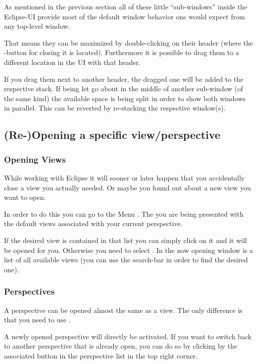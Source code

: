 \documentclass[twoside=false]{scrbook}
\newcommand{\eclipse}{Eclipse\xspace}
\begin{document}
	As mentioned in the previous section all of these little “sub-windows” inside the \eclipse-UI provide most of the default window behavior one would expect from any top-level window.
	
	That means they can be maximized by double-clicking on their header (where the -button for closing it is located). Furthermore it is possible to drag them to a different location in the UI with that header.
	
	If you drag them next to another header, the dragged one will be added to the respective stack. If being let go about in the middle of another sub-window (of the same kind) the available space is being split in order to show both windows in parallel. This can be reverted by re-stacking the respective window(s).
	
	
	\subsection{(Re-)Opening a specific view/perspective}
	\subsubsection{Opening Views}
	While working with \eclipse it will sooner or later happen that you accidentally close a view you actually needed. Or maybe you found out about a new view you want to open.
	
	In order to do this you can go to the Menu . The you are being presented with the default views associated with your current perspective.
	
	If the desired view is contained in that list you can simply click on it and it will be opened for you. Otherwise you need to select . In the now opening window is a list of all available views (you can use the search-bar in order to find the desired one).
	
	
	\subsubsection{Perspectives}
	A perspective can be opened almost the same as a view. The only difference is that you need to use .
	
	A newly opened perspective will directly be activated. If you want to switch back to another perspective that is already open, you can do so by clicking by the associated button in the perspective list in the top right corner.
	
\end{document}
